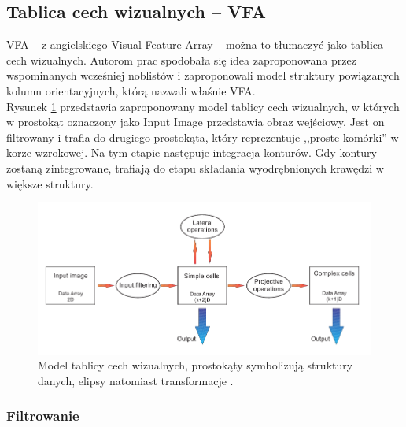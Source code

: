 \subsection{Tablica cech wizualnych -- VFA}
\label{vfa}

VFA -- z angielskiego Visual Feature Array -- można to tłumaczyć jako tablica cech wizualnych. Autorom prac \cite{Csapo2006,Resko,Resko2005} spodobała się idea zaproponowana przez wspominanych wcześniej noblistów i zaproponowali model struktury powiązanych kolumn orientacyjnych, którą nazwali właśnie VFA.\\

Rysunek \ref{fig:vfa} przedstawia zaproponowany model tablicy cech wizualnych, w których w prostokąt oznaczony jako Input Image przedstawia obraz wejściowy. Jest on filtrowany i trafia do drugiego prostokąta, który reprezentuje ,,proste komórki'' w korze wzrokowej. Na tym etapie następuje integracja konturów. Gdy kontury zostaną zintegrowane, trafiają do etapu składania wyodrębnionych krawędzi w większe struktury.\\


\begin{figure}[ht]
	\centering
	\includegraphics[width=1.00\textwidth]{images/vfa_model.png}
	\caption{Model tablicy cech wizualnych, prostokąty symbolizują struktury danych, elipsy natomiast transformacje \cite{Resko}.}
	\label{fig:vfa}
\end{figure}

\subsubsection{Filtrowanie\\}

